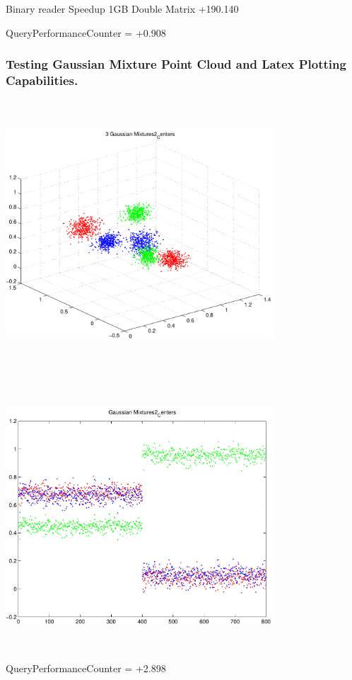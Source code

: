 \documentclass[9pt]{article}
\theoremstyle{plain}
\theoremstyle{definition}
\theoremstyle{remark}
\numberwithin{equation}{section}
\begin{document}
Binary reader Speedup 1GB Double Matrix +190.140

QueryPerformanceCounter  =  +0.908
\subsubsection{Testing Gaussian Mixture Point Cloud and Latex Plotting Capabilities.}
\includegraphics[width=10.0cm,height=10.0cm]{GaussianMixture_Dim_3_Centers2.pdf}

\includegraphics[width=10.0cm,height=10.0cm]{GaussianMixture_Dim_1_Centers2.pdf}

QueryPerformanceCounter  =  +2.898
\end{document}
